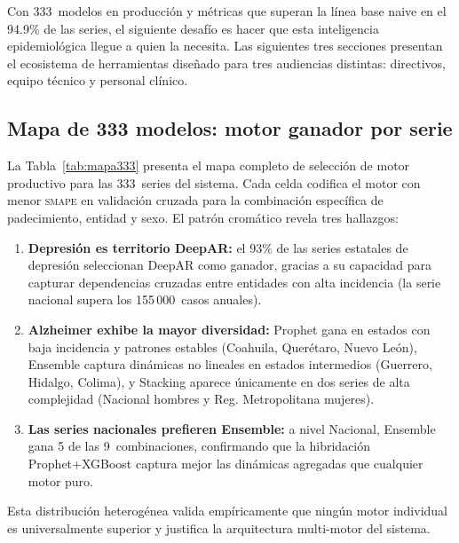 \documentclass[12pt, letterpaper]{article}
\newcommand{\smape}{\textnormal{\textsc{smape}}}
\begin{document}
Con 333~modelos en producción y métricas que superan la línea base naive en el 94.9\% de las series, el siguiente desafío es hacer que esta inteligencia epidemiológica llegue a quien la necesita. Las siguientes tres secciones presentan el ecosistema de herramientas diseñado para tres audiencias distintas: directivos, equipo técnico y personal clínico.

\subsection{Mapa de 333 modelos: motor ganador por serie}

La Tabla~\ref{tab:mapa333} presenta el mapa completo de selección de motor productivo para las 333~series del sistema. Cada celda codifica el motor con menor \smape{} en validación cruzada para la combinación específica de padecimiento, entidad y sexo. El patrón cromático revela tres hallazgos:

\begin{enumerate}
  \item \textbf{Depresión es territorio DeepAR:} el 93\% de las series estatales de depresión seleccionan DeepAR como ganador, gracias a su capacidad para capturar dependencias cruzadas entre entidades con alta incidencia (la serie nacional supera los 155\,000~casos anuales).
  \item \textbf{Alzheimer exhibe la mayor diversidad:} Prophet gana en estados con baja incidencia y patrones estables (Coahuila, Querétaro, Nuevo León), Ensemble captura dinámicas no lineales en estados intermedios (Guerrero, Hidalgo, Colima), y Stacking aparece únicamente en dos series de alta complejidad (Nacional hombres y Reg. Metropolitana mujeres).
  \item \textbf{Las series nacionales prefieren Ensemble:} a nivel Nacional, Ensemble gana 5 de las 9~combinaciones, confirmando que la hibridación Prophet+XGBoost captura mejor las dinámicas agregadas que cualquier motor puro.
\end{enumerate}

Esta distribución heterogénea valida empíricamente que ningún motor individual es universalmente superior y justifica la arquitectura multi-motor del sistema.

\newpage
\end{document}
